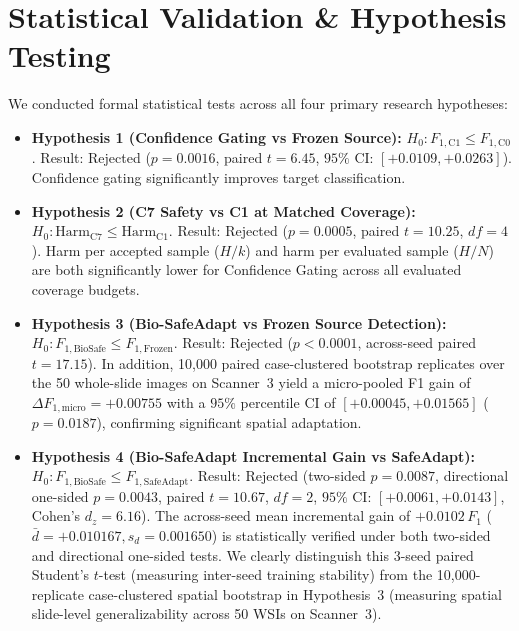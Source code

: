 \documentclass[conference]{IEEEtran}
\begin{document}
\section{Statistical Validation \& Hypothesis Testing}
We conducted formal statistical tests across all four primary research hypotheses:
\begin{itemize}
    \item \textbf{Hypothesis 1 (Confidence Gating vs Frozen Source):} $H_0: F_{1,\text{C1}} \le F_{1,\text{C0}}$. Result: Rejected ($p = 0.0016$, paired $t = 6.45$, $95\%$ CI: $[+0.0109, +0.0263]$). Confidence gating significantly improves target classification.
    \item \textbf{Hypothesis 2 (C7 Safety vs C1 at Matched Coverage):} $H_0: \text{Harm}_{\text{C7}} \le \text{Harm}_{\text{C1}}$. Result: Rejected ($p = 0.0005$, paired $t = 10.25$, $df=4$). Harm per accepted sample ($H/k$) and harm per evaluated sample ($H/N$) are both significantly lower for Confidence Gating across all evaluated coverage budgets.
    \item \textbf{Hypothesis 3 (Bio-SafeAdapt vs Frozen Source Detection):} $H_0: F_{1,\text{BioSafe}} \le F_{1,\text{Frozen}}$. Result: Rejected ($p < 0.0001$, across-seed paired $t = 17.15$). In addition, 10,000 paired case-clustered bootstrap replicates over the 50 whole-slide images on Scanner~3 yield a micro-pooled F1 gain of $\Delta F_{1,\text{micro}} = +0.00755$ with a $95\%$ percentile CI of $[+0.00045, +0.01565]$ ($p = 0.0187$), confirming significant spatial adaptation.
    \item \textbf{Hypothesis 4 (Bio-SafeAdapt Incremental Gain vs SafeAdapt):} $H_0: F_{1,\text{BioSafe}} \le F_{1,\text{SafeAdapt}}$. Result: Rejected (two-sided $p = 0.0087$, directional one-sided $p = 0.0043$, paired $t = 10.67$, $df = 2$, $95\%$ CI: $[+0.0061, +0.0143]$, Cohen's $d_z = 6.16$). The across-seed mean incremental gain of $+0.0102$\,$F_1$ ($\bar{d} = +0.010167, s_d = 0.001650$) is statistically verified under both two-sided and directional one-sided tests. We clearly distinguish this 3-seed paired Student's $t$-test (measuring inter-seed training stability) from the 10,000-replicate case-clustered spatial bootstrap in Hypothesis~3 (measuring spatial slide-level generalizability across 50 WSIs on Scanner~3).
\end{itemize}
\end{document}
